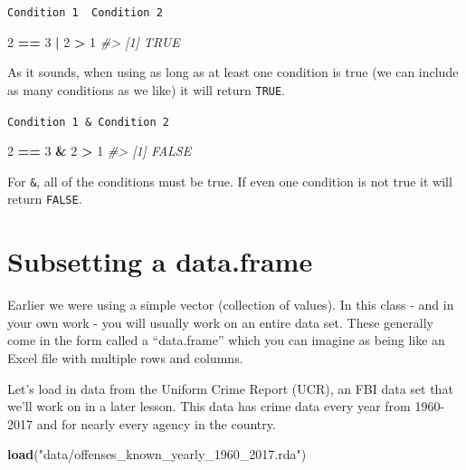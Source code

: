 \documentclass[
  12pt,
]{book}
\newenvironment{Shaded}{\begin{snugshade}}{\end{snugshade}}
\newcommand{\CommentTok}[1]{\textcolor[rgb]{0.37,0.37,0.37}{\textit{#1}}}
\newcommand{\DecValTok}[1]{\textcolor[rgb]{0.06,0.06,0.06}{#1}}
\newcommand{\KeywordTok}[1]{\textcolor[rgb]{0.27,0.27,0.27}{\textbf{#1}}}
\newcommand{\NormalTok}[1]{#1}
\newcommand{\OperatorTok}[1]{\textcolor[rgb]{0.43,0.43,0.43}{\textbf{#1}}}
\newcommand{\StringTok}[1]{\textcolor[rgb]{0.5,0.5,0.5}{#1}}
\begin{document}
\texttt{Condition\ 1\ \textbar{}\ Condition\ 2}

\begin{Shaded}
\begin{Highlighting}[]
\DecValTok{2} \OperatorTok{==}\StringTok{ }\DecValTok{3} \OperatorTok{|}\StringTok{ }\DecValTok{2} \OperatorTok{>}\StringTok{ }\DecValTok{1}
\CommentTok{\#> [1] TRUE}
\end{Highlighting}
\end{Shaded}

As it sounds, when using \texttt{\textbar{}} as long as at least one condition is true (we can include as many conditions as we like) it will return \texttt{TRUE}.

\texttt{Condition\ 1\ \&\ Condition\ 2}

\begin{Shaded}
\begin{Highlighting}[]
\DecValTok{2} \OperatorTok{==}\StringTok{ }\DecValTok{3} \OperatorTok{\&}\StringTok{ }\DecValTok{2} \OperatorTok{>}\StringTok{ }\DecValTok{1}
\CommentTok{\#> [1] FALSE}
\end{Highlighting}
\end{Shaded}

For \texttt{\&}, all of the conditions must be true. If even one condition is not true it will return \texttt{FALSE}.

\hypertarget{subsetting-a-data.frame}{%
\section{Subsetting a data.frame}\label{subsetting-a-data.frame}}

Earlier we were using a simple vector (collection of values). In this class - and in your own work - you will usually work on an entire data set. These generally come in the form called a ``data.frame'' which you can imagine as being like an Excel file with multiple rows and columns.

Let's load in data from the Uniform Crime Report (UCR), an FBI data set that we'll work on in a later lesson. This data has crime data every year from 1960-2017 and for nearly every agency in the country.

\begin{Shaded}
\begin{Highlighting}[]
\KeywordTok{load}\NormalTok{(}\StringTok{"data/offenses\_known\_yearly\_1960\_2017.rda"}\NormalTok{)}
\end{Highlighting}
\end{Shaded}
\end{document}

